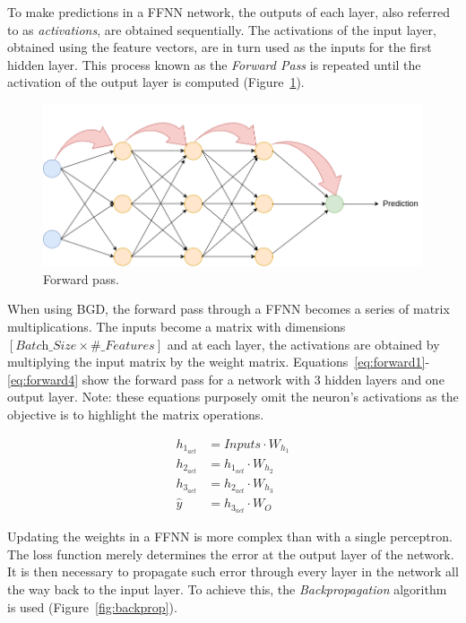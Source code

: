To make predictions in a FFNN network, the outputs of each layer, also referred
to as \textit{activations}, are obtained sequentially. The activations of the
input layer, obtained using the feature vectors, are in turn used as the inputs
for the first hidden layer. This process known as the \textit{Forward Pass} is
repeated until the activation of the output layer is computed
(Figure~\ref{fig:forward}).

\begin{figure}[!htbp]
    \centering
    \includegraphics[width=.5\textwidth]{Images/forward_pass.png}
    \caption{Forward pass.}
    \label{fig:forward}
\end{figure}

When using BGD, the forward pass through a FFNN becomes a series of matrix
multiplications. The inputs become a matrix with dimensions $[\textit{Batch\_Size} \times
\textit{\#\_Features}]$ and at each layer, the activations are obtained by multiplying
the input matrix by the weight matrix.
Equations~\ref{eq:forward1}-\ref{eq:forward4} show the forward pass for a
network with 3 hidden layers and one output layer. Note: these equations
purposely omit the neuron's activations as the objective is to highlight the
matrix operations.

\begin{align}
    h_{1_{act}} &= \textit{Inputs} \cdot W_{h_1} \label{eq:forward1}\\
    h_{2_{\textit{act}}} &= h_{1_{\textit{act}}} \cdot W_{h_2} \label{eq:forward2}\\
    h_{3_{\textit{act}}} &= h_{2_{\textit{act}}} \cdot W_{h_3} \label{eq:forward3}\\
    \hat{y} &= h_{3_{\textit{act}}} \cdot W_{O}
    \label{eq:forward4}
\end{align}

Updating the weights in a FFNN is more complex than with a single perceptron.
The loss function merely determines the error at the output layer of the
network. It is then necessary to propagate such error through every layer in the
network all the way back to the input layer. To achieve this, the
\textit{Backpropagation} algorithm~\cite{backprop} is used (Figure~\ref{fig:backprop}).

